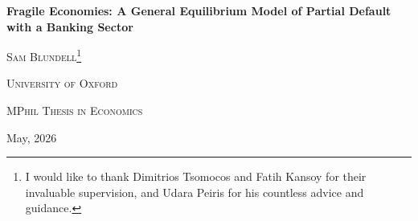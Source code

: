 \documentclass[11pt]{article}
\theoremstyle{definition}
\theoremstyle{plain}
\theoremstyle{remark}
\begin{document}
\begin{titlepage}
    \begin{center}
        \vspace*{1.5cm} %

        \renewcommand*{\thefootnote}{\fnsymbol{footnote}}

        
        {\LARGE \bfseries Fragile Economies: A General Equilibrium Model of Partial Default with a Banking Sector \par}
        
        \vspace{1.5cm}
        
        {\large \textsc{Sam Blundell}\footnote{{I would like to thank Dimitrios Tsomocos and Fatih Kansoy for their invaluable supervision, and Udara Peiris for his countless advice and guidance.}} \par}
        \vspace{0.2cm}
        
        {\large \textsc{University of Oxford} \par}
        \vspace{0.2cm}
        {\large \textsc{MPhil Thesis in Economics} \par}
        
        \vspace{1cm}
        
        {\normalsize May, 2026 \par}

        \renewcommand*{\thefootnote}{\arabic{footnote}}
        \setcounter{footnote}{0}
    \end{center}

\vspace{1cm}

\begin{abstract}
    Sovereign debt restructurings are typically followed by significant, non-linear compression of imports and declines in consumption, with the intensity of these losses often dependent on the extent of financial intermediation within the economy. Existing default frameworks fail to rationalise these regularities due to their reliance on exogenous convexity in default costs and their lack of the continuous partial-default framework necessary to capture the real effects of haircut magnitude that are amplified by the structure of the banking sector. I present a two-period general equilibrium model of partial sovereign default in which the convexity of the default penalty is structurally derived from idiosyncratic banking risk and contracting friction between domestic banking intermediaries and international lenders. I show that the slope and curvature of import compression in haircuts are amplified by the domestic banking sector's exposure to sovereign debt, delivering a cross-country mapping from financial sector composition to haircut–consumption elasticity. The model is calibrated to Sri Lanka's 2021–22 default.
    

\end{abstract}
\end{titlepage}
\end{document}
